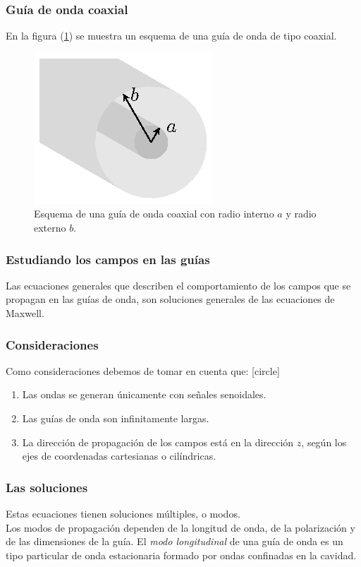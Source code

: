 \documentclass[12pt]{beamer}
\begin{document}
\begin{frame}
\frametitle{Guía de onda coaxial}
En la figura (\ref{fig:figura_02}) se muestra un esquema de una guía de onda de tipo coaxial.
\begin{figure}[H]
    \centering
    \includegraphics[scale=1.4]{Imagenes/Guia_Onda_Coaxial.eps}
    \caption{Esquema de una guía de onda coaxial con radio interno $a$ y radio externo $b$.}
    \label{fig:figura_02}
\end{figure}
\end{frame}
\begin{frame}
\frametitle{Estudiando los campos en las guías}
Las ecuaciones generales que describen el comportamiento de los campos que se propagan en las guías de onda, son soluciones generales de las ecuaciones de Maxwell.
\end{frame}
\begin{frame}
\frametitle{Consideraciones}
Como consideraciones debemos de tomar en cuenta que:
[circle]
\begin{enumerate}[<+->]
\item Las ondas se generan únicamente con señales senoidales.\item Las guías de onda son infinitamente largas.
\item La dirección de propagación de los campos está en la dirección $z$, según los ejes de coordenadas cartesianas o cilíndricas.
\end{enumerate}
\end{frame}
\begin{frame}
\frametitle{Las soluciones}
Estas ecuaciones tienen soluciones múltiples, o modos.
\\
\bigskip
\pause
Los modos de propagación dependen de la longitud de onda, de la polarización y de las dimensiones de la guía. \pause El \emph{modo longitudinal} de una guía de onda es un tipo particular de onda estacionaria formado por ondas confinadas en la cavidad.
\end{frame}
\end{document}
